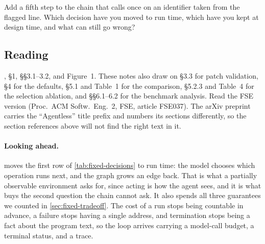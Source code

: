 \item Add a fifth step to the chain that calls  once on an identifier taken from
the flagged line. Which decision have you moved to run time, which have you kept at design time,
and what can still go wrong?

\ee

\subsection{Reading}

\citet{xia2025agentless}, \S1, \S\S3.1--3.2, and Figure~1. These notes also draw on
\S3.3 for patch validation, \S4 for the defaults, \S5.1 and Table~1 for the comparison, \S5.2.3
and Table~4 for the selection ablation, and \S\S6.1--6.2 for the benchmark analysis. Read the FSE
version (Proc.\ ACM Softw.\ Eng.\ 2, FSE, article FSE037). The arXiv preprint carries the
``Agentless'' title prefix and numbers its sections differently, so the section references above
will not find the right text in it.

\paragraph{Looking ahead.}
 moves the first row of \cref{tab:fixed-decisions} to run time: the model
chooses which operation runs next, and the graph grows an edge back. That is what a partially
observable environment asks for, since acting is how the agent sees, and it is what buys the
second question the chain cannot ask. It also spends all three guarantees we counted in
\cref{sec:fixed-tradeoff}. The cost of a run stops being countable in advance, a failure stops
having a single address, and termination stops being a fact about the program text, so the loop arrives
carrying a model-call budget, a terminal status, and a trace.
